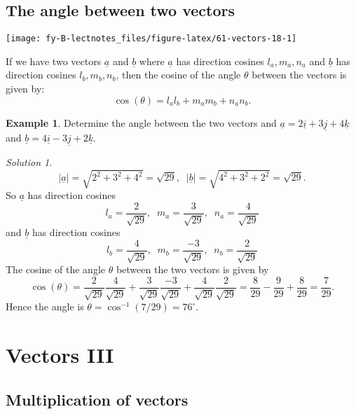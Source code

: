 \documentclass[
  11pt,
  oneside]{book}
\newcommand{\slide}{}
\theoremstyle{definition}
\theoremstyle{definition}
\newtheorem{example}{Example}[chapter]
\theoremstyle{definition}
\theoremstyle{definition}
\theoremstyle{remark}
\newtheorem*{solution}{Solution}
\begin{document}
\slide

\subsection{The angle between two vectors}\label{the-angle-between-two-vectors}

\begin{center}\texttt{[image: fy-B-lectnotes\_files/figure-latex/61-vectors-18-1]} \end{center}

If we have two vectors \(\underline a\) and \(\underline b\) where \(\underline a\) has direction cosines \(l_a, m_a, n_a\) and \(\underline b\) has direction cosines \(l_b, m_b, n_b\), then the cosine of the angle \(\theta\) between the vectors is given by:
\[
\cos(\theta) = l_al_b + m_am_b + n_an_b.
\]
\slide

\begin{example}
Determine the angle between the two vectors and \(\underline a = 2\underline i + 3\underline j + 4\underline k\) and \(\underline b = 4\underline i - 3\underline j + 2\underline k\).
\end{example}

\begin{solution}
\[
|\underline a| = \sqrt{2^2+3^2+4^2} = \sqrt{29},\;\;|\underline b| = \sqrt{4^2+3^2+2^2} = \sqrt{29}.
\]
So \(\underline a\) has direction cosines
\[
l_a = \frac{2}{\sqrt{29}},\;\;m_a = \frac{3}{\sqrt{29}},\;\;n_a = \frac{4}{\sqrt{29}}
\]
and \(\underline b\) has direction cosines
\[
l_b = \frac{4}{\sqrt{29}},\;\;m_b = \frac{-3}{\sqrt{29}},\;\;n_b = \frac{2}{\sqrt{29}}
\]
The cosine of the angle \(\theta\) between the two vectors is given by
\[
\cos(\theta) = \frac{2}{\sqrt{29}}\frac{4}{\sqrt{29}}+\frac{3}{\sqrt{29}}\frac{-3}{\sqrt{29}}+\frac{4}{\sqrt{29}}\frac{2}{\sqrt{29}} = \frac{8}{29}-\frac{9}{29}+\frac{8}{29} = \frac{7}{29}.
\]
Hence the angle is \(\theta = \cos^{-1}(7/29) = 76^\circ\).
\end{solution}

\slide

\section{Vectors III}\label{vectors-iii}

\subsection{Multiplication of vectors}\label{multiplication-of-vectors}
\end{document}
